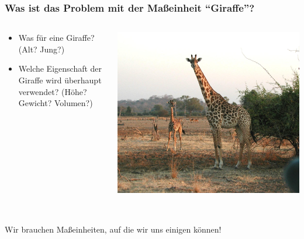 \documentclass{beamer}
\begin{document}
\begin{frame}
\frametitle{Was ist das Problem mit der Maßeinheit ``Giraffe''?}


\begin{columns}

\begin{column}{5cm}


\begin{itemize}
\item
Was für eine Giraffe? (Alt? Jung?)  
\item
Welche Eigenschaft der Giraffe wird überhaupt verwendet? (Höhe? Gewicht? Volumen?)

\end{itemize}

\end{column}

\begin{column}{5cm}

\begin{center}
\includegraphics[width=\textwidth]{Giraffen.jpg}
\end{center}



\end{column}
 


\end{columns}


$\,$\\[0.5 cm]
Wir brauchen Maßeinheiten, auf die wir uns einigen können! 

\end{frame}
\end{document}
